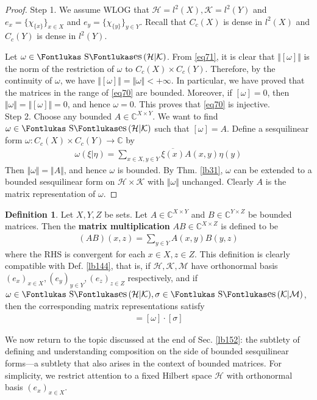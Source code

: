 \documentclass[12pt,b5paper,notitlepage]{article}
\theoremstyle{definition}
\newtheorem{df}{Definition}[subsection]
\theoremstyle{plain}
\DeclareMathOperator{\Ses}{\text{\Fontlukas S}\text{\kern -0pt {\Fontlukas\large es}}\,}
\newcommand{\ovl}{\overline}
\newcommand{\Cbb}{\mathbb C}
\newcommand{\MH}{\mathcal H}
\newcommand{\MK}{\mathcal K}
\newcommand{\MM}{\mathcal M}
\numberwithin{equation}{section}
\begin{document}
\begin{proof}
Step 1. We assume WLOG that $\MH=l^2(X),\MK=l^2(Y)$ and $e_x=\{\chi_{\{x\}}\}_{x\in X}$ and $e_y=\{\chi_{\{y\}}\}_{y\in Y}$. Recall that $C_c(X)$ is dense in $l^2(X)$ and $C_c(Y)$ is dense in $l^2(Y)$.

Let $\omega\in\Ses(\MH|\MK)$. From \eqref{eq71}, it is clear that $\Vert[\omega]\Vert$ is the norm of the restriction of $\omega$ to $C_c(X)\times C_c(Y)$. Therefore, by the continuity of $\omega$, we have $\Vert[\omega]\Vert=\Vert\omega\Vert<+\infty$. In particular, we have proved that the matrices in the range of \eqref{eq70} are bounded. Moreover, if $[\omega]=0$, then $\Vert\omega\Vert=\Vert[\omega]\Vert=0$, and hence $\omega=0$. This proves that \eqref{eq70} is injective.\\[-1ex]


Step 2. Choose any bounded $A\in\Cbb^{X\times Y}$. We want to find $\omega\in\Ses(\MH|\MK)$ such that $[\omega]=A$. Define a sesquilinear form $\omega:C_c(X)\times C_c(Y)\rightarrow\Cbb$ by
\begin{align*}
\omega(\xi|\eta)=\sum_{x\in X,y\in Y}\ovl{\xi(x)}A(x,y)\eta(y)
\end{align*}
Then $\Vert\omega\Vert=\Vert A\Vert$, and hence $\omega$ is bounded. By Thm. \ref{lb31}, $\omega$ can be extended to a bounded sesquilinear form on $\MH\times\MK$ with $\Vert\omega\Vert$ unchanged. Clearly $A$ is the matrix representation of $\omega$.
\end{proof}



\begin{df}
Let $X,Y,Z$ be sets. Let $A\in\Cbb^{X\times Y}$ and $B\in\Cbb^{Y\times Z}$ be bounded matrices. Then the \textbf{matrix multiplication} $AB\in\Cbb^{X\times Z}$  is defined to be
\begin{align*}
(AB)(x,z)=\sum_{y\in Y}A(x,y)B(y,z)
\end{align*}
where the RHS is convergent for each $x\in X,z\in Z$. This definition is clearly compatible with Def. \ref{lb144}, that is, if $\MH,\MK,\MM$ have orthonormal basis $(e_x)_{x\in X},(e_y)_{y\in Y},(e_z)_{z\in Z}$ respectively, and if $\omega\in\Ses(\MH|\MK),\sigma\in\Ses(\MK|\MM)$, then the corresponding matrix representations satisfy
\begin{align*}
[\omega\circ\sigma]=[\omega]\cdot[\sigma]
\end{align*}
\end{df}


We now return to the topic discussed at the end of Sec. \ref{lb152}: the subtlety of defining and understanding composition on the side of bounded sesquilinear forms---a subtlety that also arises in the context of bounded matrices. For simplicity, we restrict attention to a fixed Hilbert space $\MH$ with orthonormal basis $(e_x)_{x\in X}$. 
\end{document}
